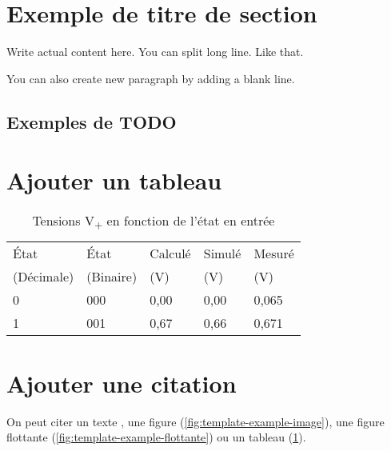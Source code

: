 \section{Exemple de titre de section}

Write actual content here.
You can split long line.
Like that.

You can also create new paragraph by adding a blank line.

\subsection{Exemples de TODO}


\section{Ajouter un tableau}

\begin{table}[h!]
    \centering
    \begin{tabular}{lllll}
        \hline
        État      & État      & Calculé & Simulé & Mesuré\\
        (Décimale)& (Binaire) & (V)     & (V)    & (V)\\
        \hline\hline
        0 & 000 & 0,00 & 0,00 & 0,065\\
        1 & 001 & 0,67 & 0,66 & 0,671\\
        \hline
    \end{tabular}
    \caption{Tensions V\textsubscript{+} en fonction de l'état en entrée}
    \label{tab:template-Vout}
\end{table}

\section{Ajouter une citation}

On peut citer
un texte \cite{boutin_en_2009},
une figure (\ref{fig:template-example-image}),
une figure flottante (\ref{fig:template-example-flottante}) ou
un tableau (\ref{tab:template-Vout}).

